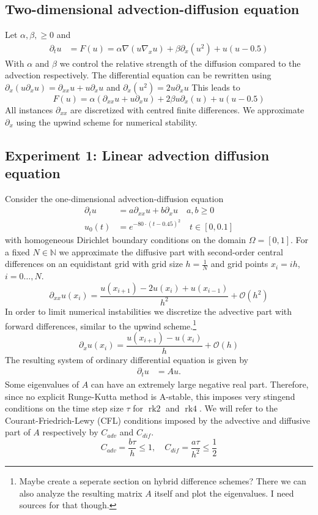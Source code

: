 \documentclass{scrartcl}
\begin{document}
	\subsection{Two-dimensional advection-diffusion equation}
	Let $\alpha,\beta,\ge 0$ and 
	\begin{align*}
	\partial_tu &= F(u) = \alpha\nabla(u\nabla_xu) + \beta\partial_x(u^2) + u(u-0.5)
	\end{align*}
	With $\alpha$ and $\beta$ we control the relative strength of the diffusion compared to the advection respectively. The differential equation can be rewritten using $\partial_x(u\partial_xu) = \partial_{xx}u + u\partial_{x}u$ and $\partial_x(u^2) = 2u\partial_{x}u$
	This leads to
	\[
	F(u) = 
	\alpha(\partial_{xx}u + u\partial_{x}u) 
	+ 2\beta u\partial_x(u) 
	+ u(u-0.5)
	\]
	All instances $\partial_{xx}$ are discretized with centred finite differences. We approximate $\partial_{x}$ using the upwind scheme for numerical stability.
	
	\subsection{Experiment 1: Linear advection diffusion equation}
	Consider the one-dimensional advection-diffusion equation
	\begin{align*}
	\partial_tu &= a\partial_{xx}u + b\partial_xu \quad a,b\ge 0\\
	u_0(t) &= e^{-80\cdot(t-0.45)^2} \quad t\in[0,0.1]
	\end{align*}
	with homogeneous Dirichlet boundary conditions on the domain $\Omega = [0,1]$. 
	For a fixed $N\in\mathbb N$ we approximate the diffusive part with second-order central differences on an equidistant grid with grid size $h = \frac{1}{N}$ and grid points $x_i = ih$, $i=0\dots,N$.
	\[\partial_{xx}u(x_i) = \frac{u(x_{i+1}) - 2u(x_i) + u(x_{i-1})}{{h}^2} + \mathcal{O}({h}^2)\]
	In order to limit numerical instabilities we discretize the advective part with forward differences, similar to the upwind scheme.\footnote{Maybe create a seperate section on hybrid difference schemes? There we can also analyze the resulting matrix $A$ itself and plot the eigenvalues. I need sources for that though.}
	\[\partial_{x}u(x_i) = \frac{u(x_{i+1}) - u(x_i)}{h} + \mathcal{O}(h)\]
	The resulting system of ordinary differential equation is given by
	\begin{align*}
	\partial_tu &= Au.
	\end{align*} 
	Some eigenvalues of $A$ can have an extremely large negative real part. Therefore, since no explicit Runge-Kutta method is A-stable, this imposes very stingend conditions on the time step size $\tau$ for $\operatorname{rk2}$ and $\operatorname{rk4}$. We will refer to the Courant-Friedrich-Lewy (CFL) conditions imposed by the advective and diffusive part of $A$ respectively by $C_{adv}$ and $C_{dif}$.  
	\[ C_{adv} = \frac{b\tau}{h} \le 1, \quad C_{dif} = \frac{a\tau}{h^2} \le \frac{1}{2}\] 
	
\end{document}
